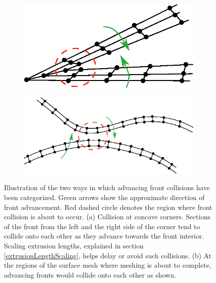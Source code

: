 \begin{figure}
\centering
\begin{subfigure}{0.5\textwidth}
\includegraphics[width=0.9\linewidth]{img/m2/cornerCollision/cornerCollisionIllustration.eps}
\caption{}
\label{fig-cornerCollisionIllustration}
\end{subfigure}%
\begin{subfigure}{0.5\textwidth}
\includegraphics[width =0.9\linewidth]{img/m2/headOnCollision/headOnCollisionIllustration.eps}
\caption{}
\label{fig-headOnCollisionIllustration}
\end{subfigure}
\caption[Two ways of front collision --- corner collision and head on collision.]{Illustration of the two ways in which advancing front collisions have been categorized. Green arrows show the approximate direction of front advancement. Red dashed circle denotes the region where front collision is about to occur. (a) Collision at concave corners. Sections of the front from the left and the right side of the corner tend to collide onto each other as they advance towards the front interior. Scaling extrusion lengths, explained in section \ref{extrusionLengthScaling}, helps delay or avoid such collisions. (b) At the regions of the surface mesh where meshing is about to complete, advancing fronts would collide onto each other as shown.}
\label{fig-collisionIllustration}
\end{figure}

